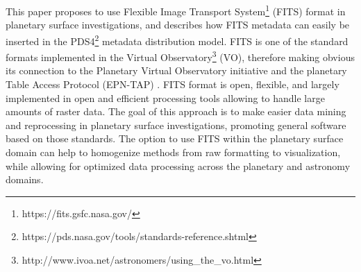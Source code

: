 This paper proposes to use Flexible Image Transport
System\footnote{https://fits.gsfc.nasa.gov/}
(FITS) format \citep{fitsorig,fitsver3} in planetary surface investigations,
and describes how FITS metadata can easily be inserted in the
PDS4\footnote{https://pds.nasa.gov/tools/standards-reference.shtml}
metadata distribution model.
FITS is one of the standard formats implemented in the Virtual
Observatory\footnote{http://www.ivoa.net/astronomers/using\_the\_vo.html}
(VO), therefore making obvious its connection to the Planetary Virtual
Observatory initiative and the planetary Table Access Protocol (EPN-TAP)
\citep{ERARDepntap}.
FITS format is open, flexible, and largely implemented in open and efficient
processing tools allowing to handle large amounts of raster data.
The goal of this approach is to make easier data mining and reprocessing
in planetary surface investigations, promoting general software based on those
standards.
The option to use FITS within the planetary surface domain can help to
homogenize methods from raw formatting to visualization, while
allowing for optimized data processing across the planetary and astronomy domains.

\DIFdelbegin {}  \DIFdelend



